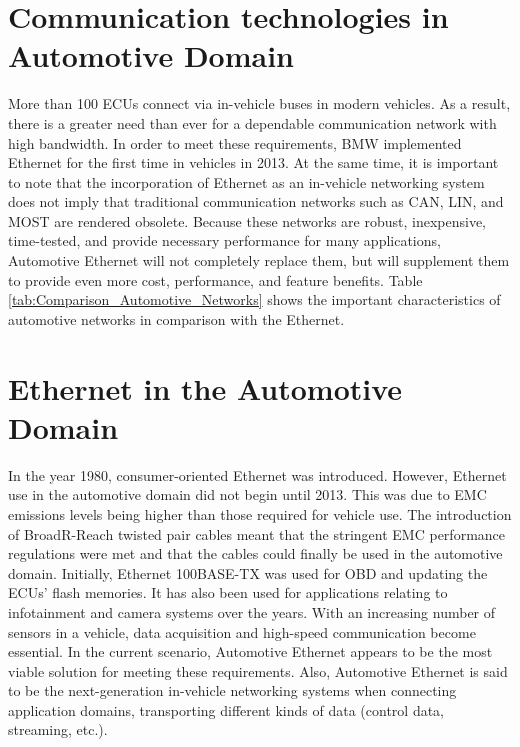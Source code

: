 \section{Communication technologies in Automotive Domain}
More than 100 ECUs connect via in-vehicle buses in modern vehicles\cite{b1.0}. As a result, there is a greater need than ever for a dependable communication network with high bandwidth. In order to meet these requirements, BMW implemented Ethernet for the first time in vehicles in 2013. At the same time, it is important to note that the incorporation of Ethernet as an in-vehicle networking system does not imply that traditional communication networks such as CAN, LIN, and MOST are rendered obsolete. Because these networks are robust, inexpensive, time-tested, and provide necessary performance for many applications, Automotive Ethernet will not completely replace them, but will supplement them to provide even more cost, performance, and feature benefits. Table \ref{tab:Comparison_Automotive_Networks} shows the important characteristics of automotive networks in comparison with the Ethernet.


\section{Ethernet in the Automotive Domain}
\label{sec:EthernetInTheAutomotiveDomain}
In the year 1980, consumer-oriented Ethernet was introduced. However, Ethernet use in the automotive domain did not begin until 2013. This was due to EMC emissions levels being higher than those required for vehicle use. The introduction of BroadR-Reach twisted pair cables meant that the stringent EMC performance regulations were met and that the cables could finally be used in the automotive domain. Initially, Ethernet 100BASE-TX was used for OBD and updating the ECUs' flash memories\cite{b1.0.1_AE_History}. It has also been used for applications relating to infotainment and camera systems over the years. With an increasing number of sensors in a vehicle, data acquisition and high-speed communication become essential. In the current scenario, Automotive Ethernet appears to be the most viable solution for meeting these requirements. Also, Automotive Ethernet is said to be the next-generation in-vehicle networking systems when connecting application domains, transporting different kinds of data (control data, streaming, etc.)\cite{b1.0.1_AE_History}.  

